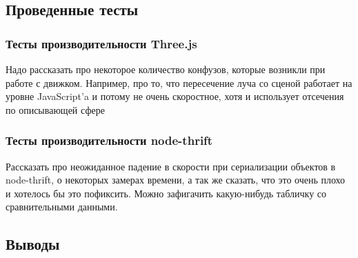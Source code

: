 \documentclass[12pt, a4paper]{article}
\begin{document}
\subsection{Проведенные тесты}
\subsubsection{Тесты производительности Three.js}
Надо рассказать про некоторое количество конфузов, которые возникли при работе
с движком. Например, про то, что пересечение луча со сценой работает на уровне
JavaScript'a и потому не очень скоростное, хотя и использует отсечения по
описывающей сфере
\subsubsection{Тесты производительности node-thrift}
Рассказать про неожиданное падение в скорости при сериализации объектов в
node-thrift, о некоторых замерах времени, а так же сказать, что это очень плохо
и хотелось бы это пофиксить. Можно зафигачить какую-нибудь табличку со
сравнительными данными.
\subsection{Выводы}
\end{document}
